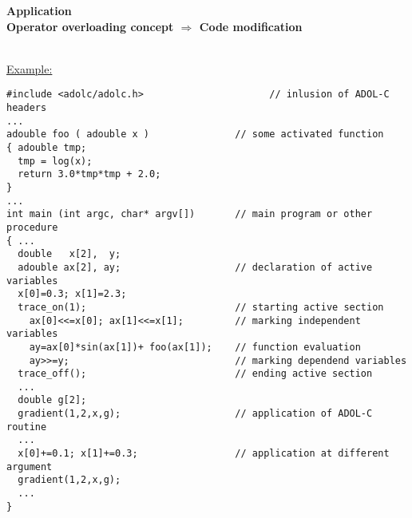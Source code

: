 \documentclass[12pt,oneside,a4paper]{article}
\begin{document}
\newpage
\begin{center}\Large
{\Huge \bf Application}\\[2ex]
{\bf Operator overloading concept $\Rightarrow$ Code modification}\\[2ex]
\\[5ex]
%
\begin{minipage}[h]{160mm}
\small
\underline{Example:}
\begin{verbatim}
#include <adolc/adolc.h>                      // inlusion of ADOL-C headers
...
adouble foo ( adouble x )               // some activated function
{ adouble tmp;
  tmp = log(x);
  return 3.0*tmp*tmp + 2.0; 
}
...
int main (int argc, char* argv[])       // main program or other procedure
{ ...
  double   x[2],  y;               
  adouble ax[2], ay;                    // declaration of active variables
  x[0]=0.3; x[1]=2.3;      
  trace_on(1);                          // starting active section
    ax[0]<<=x[0]; ax[1]<<=x[1];         // marking independent variables
    ay=ax[0]*sin(ax[1])+ foo(ax[1]);    // function evaluation
    ay>>=y;                             // marking dependend variables
  trace_off();                          // ending active section
  ...
  double g[2];    
  gradient(1,2,x,g);                    // application of ADOL-C routine
  ...
  x[0]+=0.1; x[1]+=0.3;                 // application at different argument
  gradient(1,2,x,g);
  ...
}
\end{verbatim}
\end{minipage}
\end{center}
\end{document}

